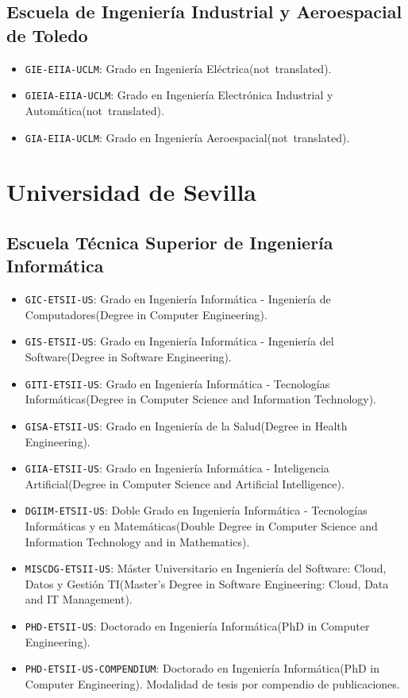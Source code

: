 \subsection {Escuela de Ingeniería Industrial y Aeroespacial de Toledo}
\begin {itemize}
\item \texttt {GIE-EIIA-UCLM}: Grado en Ingeniería Eléctrica\nobreakspace {}(\mbox {not translated}).
\item \texttt {GIEIA-EIIA-UCLM}: Grado en Ingeniería Electrónica Industrial y Automática\nobreakspace {}(\mbox {not translated}).
\item \texttt {GIA-EIIA-UCLM}: Grado en Ingeniería Aeroespacial\nobreakspace {}(\mbox {not translated}).
\end {itemize}
\section {Universidad de Sevilla}
\subsection {Escuela Técnica Superior de Ingeniería Informática}
\begin {itemize}
\item \texttt {GIC-ETSII-US}: Grado en Ingeniería Informática - Ingeniería de Computadores\nobreakspace {}(Degree in Computer Engineering).
\item \texttt {GIS-ETSII-US}: Grado en Ingeniería Informática - Ingeniería del Software\nobreakspace {}(Degree in Software Engineering).
\item \texttt {GITI-ETSII-US}: Grado en Ingeniería Informática - Tecnologías Informáticas\nobreakspace {}(Degree in Computer Science and Information Technology).
\item \texttt {GISA-ETSII-US}: Grado en Ingeniería de la Salud\nobreakspace {}(Degree in Health Engineering).
\item \texttt {GIIA-ETSII-US}: Grado en Ingeniería Informática - Inteligencia Artificial\nobreakspace {}(Degree in Computer Science and Artificial Intelligence).
\item \texttt {DGIIM-ETSII-US}: Doble Grado en Ingeniería Informática - Tecnologías Informáticas y en Matemáticas\nobreakspace {}(Double Degree in Computer Science and Information Technology and in Mathematics).
\item \texttt {MISCDG-ETSII-US}: Máster Universitario en Ingeniería del Software: Cloud, Datos y Gestión TI\nobreakspace {}(Master's Degree in Software Engineering: Cloud, Data and IT Management).
\item \texttt {PHD-ETSII-US}: Doctorado en Ingeniería Informática\nobreakspace {}(PhD in Computer Engineering).
\item \texttt {PHD-ETSII-US-COMPENDIUM}: Doctorado en Ingeniería Informática\nobreakspace {}(PhD in Computer Engineering). Modalidad de tesis por compendio de publicaciones.
\end {itemize}
\endgroup
